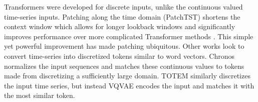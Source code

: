 Transformers were developed for discrete inputs, unlike the continuous valued time-series inputs.
Patching along the time domain (PatchTST) shortens the context window which allows for longer lookback windows and significantly improves performance over more complicated Transformer methods \cite{nie.patchtst.2023a}.
This simple yet powerful improvement has made patching ubiquitous.
Other works look to convert time-series into discretized tokens similar to word vectors.
Chronos \cite{ansari2024chronoslearninglanguagetime} normalizes the input sequences and matches these continuous values to tokens made from discretizing a sufficiently large domain.
TOTEM \cite{talukder2024totem} similarly discretizes the input time series, but instead VQVAE \cite{vandenoord.vqvae.2017} encodes the input and matches it with the most similar token.